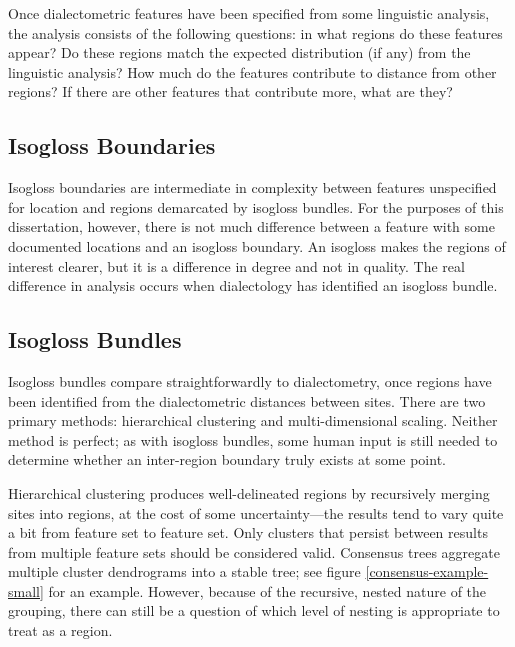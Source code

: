 Once dialectometric features have been specified from some linguistic
analysis, the analysis consists of the following questions: in what
regions do these features appear? Do these regions match the expected
distribution (if any) from the linguistic analysis? How much do
the features contribute to distance from other regions? If there are
other features that contribute more, what are they?


\subsection{Isogloss Boundaries}

Isogloss boundaries are intermediate in complexity between features unspecified
for location and regions demarcated by isogloss bundles. For the
purposes of this dissertation, however, there is not much difference
between a feature with some documented locations and an isogloss
boundary. An isogloss makes the regions of interest clearer, but it is
a difference in degree and not in quality. The real difference in
analysis occurs when dialectology has identified an isogloss bundle.

\subsection{Isogloss Bundles}

Isogloss bundles compare straightforwardly to dialectometry, once
regions have been identified from the dialectometric distances between
sites. There are two primary methods: hierarchical clustering and
multi-dimensional scaling. Neither method is perfect; as with isogloss
bundles, some human input is still needed to determine whether an
inter-region boundary truly exists at some point.

Hierarchical clustering produces well-delineated regions by
recursively merging sites into regions, at the cost of some
uncertainty---the results tend to vary quite a bit from feature set to
feature set. Only clusters that persist between results from multiple
feature sets should be considered valid. Consensus trees aggregate
multiple cluster dendrograms into a stable tree; see figure
\ref{consensus-example-small} for an example. However, because of
the recursive, nested nature of the grouping, there can still be a
question of which level of nesting is appropriate to treat as
a region.

